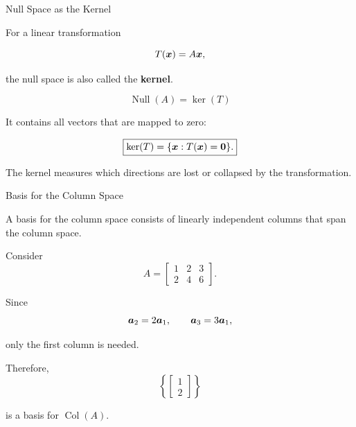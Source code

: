 
\begin{frame}{Null Space as the Kernel}

For a linear transformation

\[
T(\bm{x})=A\bm{x},
\]

the null space is also called the \textbf{kernel}.

\[
\boxed{
\operatorname{Null}(A)
=
\ker(T)
}
\]

\vspace{0.4cm}

It contains all vectors that are mapped to zero:

\[
\boxed{
\ker(T)
=
\{\bm{x}:T(\bm{x})=\mathbf{0}\}.
}
\]

\vspace{0.4cm}

The kernel measures which directions are lost or collapsed
by the transformation.

\end{frame}



\begin{frame}{Basis for the Column Space}

A basis for the column space consists of linearly independent
columns that span the column space.

Consider
\vspace{-0.1cm}
\[
A=
\begin{bmatrix}
1&2&3\\
2&4&6
\end{bmatrix}.
\]

Since
\vspace{-0.1cm}
\[
\bm{a}_2=2\bm{a}_1,
\qquad
\bm{a}_3=3\bm{a}_1,
\]

only the first column is needed.

Therefore,
\vspace{-0.1cm}
\[
\boxed{
\left\{
\begin{bmatrix}
1\\2
\end{bmatrix}
\right\}
}
\]

is a basis for $\operatorname{Col}(A)$.

\end{frame}


